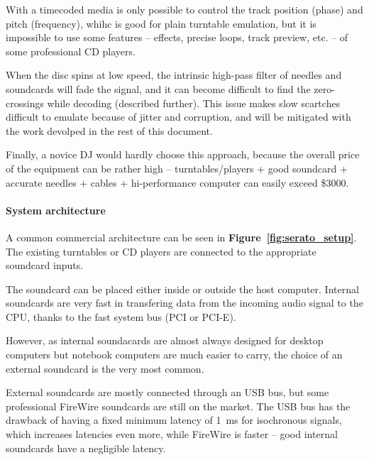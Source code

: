 \documentclass[a4paper,10pt]{article}
\begin{document}
\begin{multicols}{2}
With a timecoded media is only possible to control the track position (phase)
and pitch (frequency), whihc is good for plain turntable emulation, but it is
impossible to use some features -- effects, precise loops, track preview, etc.
-- of some professional CD players.

When the disc spins at low speed, the intrinsic high-pass filter of needles
and soundcards will fade the signal, and it can become difficult to find the
zero-crossings while decoding (described further). This issue makes slow
scartches difficult to emulate because of jitter and corruption, and will be
mitigated with the work devolped in the rest of this document.

Finally, a novice DJ would hardly choose this approach, because the overall
price of the equipment can be rather high -- turntables/players + good
soundcard + accurate needles + cables + hi-performance computer can easily
exceed \$3000. 


\paragraph{System architecture}
A common commercial architecture \cite{rane_ssl}\cite{ni_tsp} can be seen in
\textbf{Figure~\ref{fig:serato_setup}}. The existing turntables or CD players
are connected to the appropriate soundcard inputs.

The soundcard can be placed either inside or outside the host computer.
Internal soundcards are very fast in transfering data from the incoming audio
signal to the CPU, thanks to the fast system bus (PCI or PCI-E).

However, as internal soundacards are almost always designed for desktop
computers but notebook computers are much easier to carry, the choice of an
external soundcard is the very most common.

External soundcards are mostly connected through an USB bus, but some
professional FireWire soundcards are still on the market. The USB bus has the
drawback of having a fixed minimum latency of 1~ms for isochronous signals,
which increases latencies even more, while FireWire is faster -- good internal
soundcards have a negligible latency.


\end{multicols}
\end{document}
